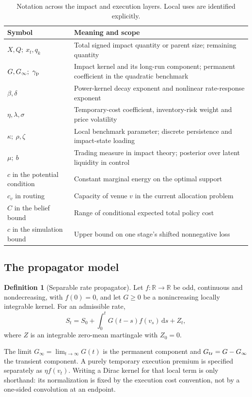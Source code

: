 \documentclass[11pt]{article}
\numberwithin{equation}{section}
\theoremstyle{definition}
\newtheorem{definition}[theorem]{Definition}
\theoremstyle{remark}
\newcommand{\R}{\mathbb{R}}
\theoremstyle{definition}
\newcommand{\dd}{\,\mathrm d}
\begin{document}
\begin{table}[!htbp]
\centering\small
\caption{Notation across the impact and execution layers. Local uses are identified explicitly.}
\label{tab:notation}
\begin{tabularx}{\textwidth}{p{}Y}
\toprule Symbol & Meaning and scope \\\midrule
$X,Q;\ x_t,q_k$ & Total signed impact quantity or parent size; remaining quantity \\
$G,G_\infty;\ \gamma_{\rm p}$ & Impact kernel and its long-run component; permanent coefficient in the quadratic benchmark \\
$\beta,\delta$ & Power-kernel decay exponent and nonlinear rate-response exponent \\
$\eta,\lambda,\sigma$ & Temporary-cost coefficient, inventory-risk weight and price volatility \\
$\kappa;\ \rho,\zeta$ & Local benchmark parameter; discrete persistence and impact-state loading \\
$\mu;\ b$ & Trading measure in impact theory; posterior over latent liquidity in control \\
$c$ in the potential condition & Constant marginal energy on the optimal support \\
$c_v$ in routing & Capacity of venue $v$ in the current allocation problem \\
$C$ in the belief bound & Range of conditional expected total policy cost \\
$c$ in the simulation bound & Upper bound on one stage's shifted nonnegative loss \\
\bottomrule
\end{tabularx}
\end{table}

\subsection{The propagator model}
\begin{definition}[Separable rate propagator]\label{def:model}
Let $f:\R\to\R$ be odd, continuous and nondecreasing, with $f(0)=0$, and let
$G\geq0$ be a nonincreasing locally integrable kernel. For an admissible rate,
\begin{equation}\label{eq:price}
 S_t=S_0+\int_0^tG(t-s)f(v_s)\dd s+Z_t,
\end{equation}
where $Z$ is an integrable zero-mean martingale with $Z_0=0$.
\end{definition}
The limit $G_\infty=\lim_{t\to\infty}G(t)$ is the permanent component and
$G_{\rm tr}=G-G_\infty$ the transient component. A purely temporary execution
premium is specified separately as $\eta f(v_t)$. Writing a Dirac kernel for
that local term is only shorthand: its normalization is fixed by the execution
cost convention, not by a one-sided convolution at an endpoint.
\end{document}
